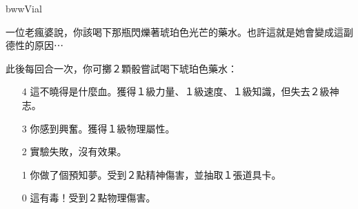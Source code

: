 \begin{OmenCard}{bww}{Vial}{}
  \begin{CardStory}
    一位老瘋婆說，你該喝下那瓶閃爍著琥珀色光芒的藥水。也許這就是她會變成這副德性的原因⋯
  \end{CardStory}
  此後每回合一次，你可擲２顆骰嘗試喝下琥珀色藥水：
  \begin{itemize}
    \item[4] 這不曉得是什麼血。獲得１級力量、１級速度、１級知識，但失去２級神志。
    \item[3] 你感到興奮。獲得１級物理屬性。
    \item[2] 實驗失敗，沒有效果。
    \item[1] 你做了個預知夢。受到２點精神傷害，並抽取１張道具卡。
    \item[0] 這有毒！受到２點物理傷害。
  \end{itemize}
\end{OmenCard}%
\linebreak[0]%
